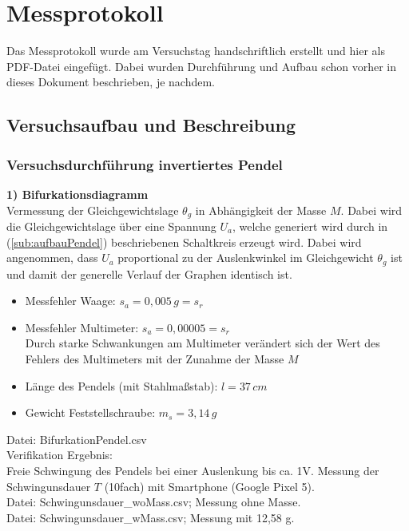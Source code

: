 

\def\skalierung{0.65}

\chapter{Messprotokoll}
\label{chap:protokoll}

Das Messprotokoll wurde am Versuchstag handschriftlich erstellt und hier als
PDF-Datei eingefügt. Dabei wurden Durchführung und Aufbau schon vorher in dieses
Dokument beschrieben, je nachdem.

\section{Versuchsaufbau und Beschreibung}
\label{sec:aufbau}



\subsection{Versuchsdurchführung invertiertes Pendel}

\textbf{1) Bifurkationsdiagramm}\\
Vermessung der Gleichgewichtslage $\theta_g$ in Abhängigkeit der Masse $M$. Dabei wird die Gleichgewichtslage über eine Spannung $U_a$, welche generiert wird durch in (\ref{sub:aufbauPendel}) beschriebenen Schaltkreis erzeugt wird. Dabei wird angenommen, dass $U_a$ proportional zu der Auslenkwinkel im Gleichgewicht $\theta_g$ ist und damit der generelle Verlauf der Graphen identisch ist.\\
\begin{itemize}
\item Messfehler Waage: $s_a = 0,005\, g = s_r$\\
\item Messfehler Multimeter: $s_a = 0,00005 = s_r$\\
      Durch starke Schwankungen am Multimeter verändert sich der Wert des Fehlers des Multimeters mit der Zunahme der Masse $M$\\
\item Länge des Pendels (mit Stahlmaßstab): $l = 37 \, cm$\\
\item Gewicht Feststellschraube: $m_s = 3,14 \,g$\\
\end{itemize}
Datei: BifurkationPendel.csv\\
Verifikation Ergebnis:\\
Freie Schwingung des Pendels bei einer Auslenkung bis ca. 1V. Messung der Schwingunsdauer $T$ (10fach) mit Smartphone (Google Pixel 5).\\
Datei: Schwingunsdauer\_woMass.csv; Messung ohne Masse.\\
Datei: Schwingunsdauer\_wMass.csv; Messung mit 12,58 g.\\


